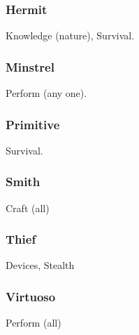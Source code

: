 \subsubsection{Hermit}
 Knowledge (nature), Survival.

\subsubsection{Minstrel}
 Perform (any one).

\subsubsection{Primitive}
 Survival.

\subsubsection{Smith}
 Craft (all)

\subsubsection{Thief}
 Devices, Stealth

\subsubsection{Virtuoso}
 Perform (all)
